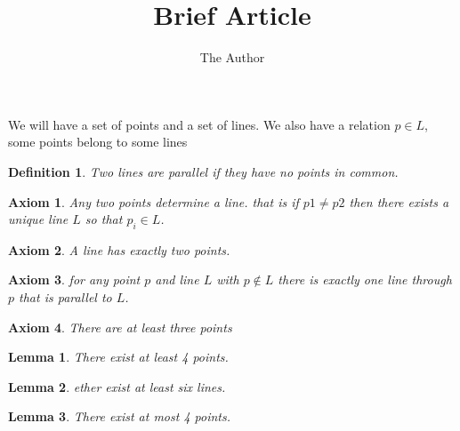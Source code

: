 \documentclass[11pt, oneside]{article}   	%
\title{Brief Article}
\author{The Author}
\newtheorem{axiom}{Axiom}
\newtheorem{lemma}{Lemma}
\newtheorem{definition}{Definition}
\begin{document}
\maketitle
We will have a set of points and a set of lines. We also have a relation $p \in L$, some points belong to some lines
\begin{definition}
Two lines are parallel if they have no points in common.
\end{definition}
\begin{axiom}
Any two points determine a line. that is if $p1\ne p2$ then there exists a unique line $L$ so that $p_{i} \in L$.
\end{axiom}

\begin{axiom}
A line has exactly two points.
\end{axiom}

\begin{axiom}
for any point $p$ and line $L$ with $p \not \in L$  there is exactly one line  through $p$ that is parallel to $L$.
\end{axiom}

\begin{axiom}
There are at least three points
\end{axiom}


\begin{lemma}
There exist at least 4 points.
\end{lemma}
\begin{lemma}
ether exist at least six lines.
\end{lemma}
\begin{lemma}
There exist at most 4 points.
\end{lemma}
\end{document}
